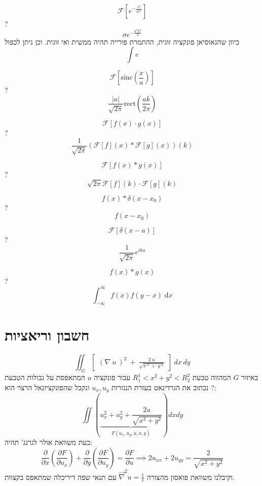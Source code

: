 \documentclass{tstextbook}
\begin{document}
$$\mathcal{F} [{e^{-\frac{x^2}{2\sigma^2}}}]$$
?
$$\sigma e^{-\frac{\sigma^2 k^2 }{2}}$$
כיוון שהגאוסיאן פונקציה זוגית, ההתמרת פורייה תהיה ממשית ואי זוגית. וכן ניתן לכפול
$$\int e$$

$$\mathcal{F}\left[  \mathrm{sinc}\left( \frac{x}{a} \right) \right] $$
?
$$\frac{|a|}{\sqrt{ 2\pi }}\mathrm{rect}\left( \frac{ak}{2\pi} \right)$$

$$\mathcal{F} \left[ f(x)\cdot g(x) \right]$$
?
$$\frac{1}{\sqrt{ 2\pi }}(\mathcal{F}[f](x)*\mathcal{F}[g](x))(k)$$

$$\mathcal{F}[ f(x)*g(x)]$$
?
$$\sqrt{ 2\pi }\mathcal{F}[f](k)\cdot \mathcal{F}[g](k)$$

$$f(x)*\delta(x-x_{0})$$
?
$$f(x-x_{0})$$

$$\mathcal{F}[ \delta(x-a)]$$
?
$$\frac{1}{\sqrt{2\pi}} e^{ika}$$

$$f(x)*g(x)$$
?
$$\int_{-\infty}^\infty f(x)f(y-x)\;\mathrm{d}x$$

\section{חשבון וריאציות}

$$ \iint_G\left[\begin{array}{cccc}\left(\nabla\:u\:\right)^2\:+\:\frac{2\:u}{\sqrt{x\:^2\:+\:y\:^2}}\end{array}\right]\:dx\:dy$$
באיזור \(G\) המהווה טבעת \(R_{1}^1<x^2+y^2<R_{2}^2\) עבור פונקציה \(u\) המתאפסת על גבולות הטבעת
?
נכתוב את הגרדינאט בעזרת הנגזרות \(u_{x},u_{y}\) ונקבל שהפונקציונאל הרצוי הוא:
$$ \iint\left(\underbrace{u_x^2+u_y^2+\frac{2u}{\sqrt{x^2+y^2}}}_{F(u_x,u_y,u,x,y)}\right)dxdy$$
כעת משוואת אולר לגרנג' תהיה:
$$\frac{\partial}{\partial x}\left(\frac{\partial F}{\partial u_x}\right)\!+\!\frac{\partial}{\partial y}\left(\frac{\partial F}{\partial u_y}\right)\!=\!\frac{\partial F}{\partial u}\!\implies\! 2u_{xx}\!+\!2u_{yy}=\frac{2}{\sqrt{ x^2+y^2}}$$
וקיבלנו משוואת פואסון מהצורה \(\vec{\nabla} ^2u=\frac{1}{r}\) עם תנאי שפה דיריכלה שמתאפס בקצוות.
\end{document}
